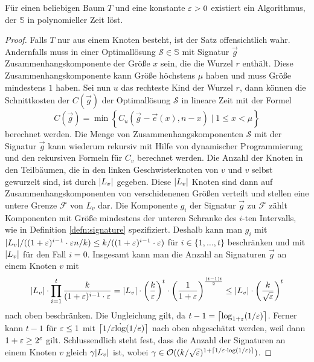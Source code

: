 \begin{thm}
    Für einen beliebigen Baum $T$ und eine konstante $\eps > 0$ existiert ein Algorithmus, der $\mathbb{S}$ in polynomieller Zeit löst.
\end{thm}
\begin{proof}
    Falls $T$ nur aus einem Knoten besteht, ist der Satz offensichtlich wahr.
    Andernfalls muss in einer Optimallösung $\mathcal{S} \in \mathbb{S}$ mit Signatur $\vec{g}$ Zusammenhangskomponente der Größe $x$ sein, die die Wurzel $r$ enthält.
    Diese Zusammenhangskomponente kann Größe höchstens $\mu$ haben und muss Größe mindestens $1$ haben.
    Sei nun $u$ das rechteste Kind der Wurzel $r$, dann können die Schnittkosten der $C(\vec{g})$ der Optimallösung $\mathcal{S}$ in lineare Zeit mit der Formel
    \begin{equation} \label{eq:root}
        C(\vec{g}) = \min \left\{ C_u(\vec{g} - \vec{e}(x), n - x) \mid 1 \leq x < \mu \right\}
    \end{equation}
    berechnet werden.
    Die Menge von Zusammenhangskomponenten $\mathcal{S}$ mit der Signatur $\vec{g}$ kann wiederum rekursiv mit Hilfe von dynamischer Programmierung und den rekursiven Formeln für $C_v$ berechnet werden.
    Die Anzahl der Knoten in den Teilbäumen, die in den linken Geschwisterknoten von $v$ und $v$ selbst gewurzelt sind, ist durch $\card{L_v}$ gegeben.
    Diese $\card{L_v}$ Knoten sind dann auf Zusammenhangskomponenten von verschidenenen Größen verteilt und stellen eine untere Grenze $\mathcal{F}$ von $L_v$ dar.
    Die Komponente $g_i$ der Signatur $\vec{g}$ zu $\mathcal{F}$ zählt Komponenten mit Größe mindestens der unteren Schranke des $i$-ten Intervalls, wie in Definition \ref{defn:signature} spezifiziert.
    Deshalb kann man $g_i$ mit $\card{L_v}/((1 + \eps)^{i - 1} \cdot \eps n/k) \leq k/((1 + \eps)^{i - 1} \cdot \eps)$ für $i \in \{1, \ldots, t\}$ beschränken und mit $\card{L_v}$ für den Fall $i = 0$.
    Insgesamt kann man die Anzahl an Signaturen $\vec{g}$ an einem Knoten $v$ mit
    \begin{equation*}
        \card{L_v} \cdot \prod^t_{i=1} \frac{k}{(1 + \eps)^{i - 1} \cdot \eps} 
        = \card{L_v} \cdot \left( \frac{k}{\eps} \right)^t \cdot \left( \frac{1}{1 + \eps} \right)^{\frac{(t-1)t}{2}} 
        \leq \card{L_v} \cdot \left( \frac{k}{\sqrt{\eps}} \right)^t
    \end{equation*}
    nach oben beschränken. 
    Die Ungleichung gilt, da $t - 1 = \ceil*{\log_{1 + \eps}(1/\eps)}$. 
    Ferner kann $t - 1$ für $\eps \leq 1$ mit $\ceil*{1/\eps \dot \log(1/e)}$ nach oben abgeschätzt werden, weil dann $1 + \eps \geq 2^\eps$ gilt.
    Schlussendlich steht fest, dass die Anzahl der Signaturen an einem Knoten $v$ gleich $\gamma \card{L_v}$ ist, wobei $\gamma \in \bigO((k/\sqrt{\eps})^{1 + \ceil{1/\eps \cdot \log(1/\eps)}})$.


\end{proof}
